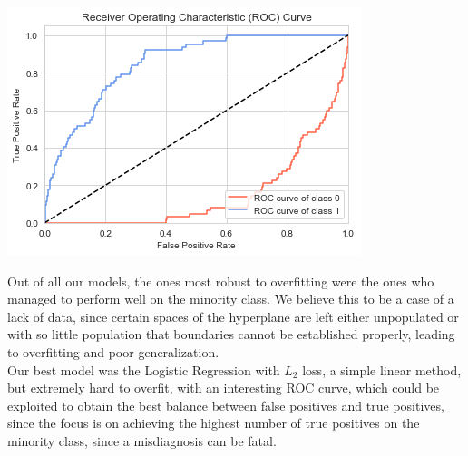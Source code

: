 \documentclass[landscape,a0paper,fontscale=0.285]{baposter} %
\begin{document}
\begin{poster}
{\begin{multicols}{2}
  \begin{center}
  \includegraphics[width=0.9\linewidth]{rocfinak.png}
  \label{fig:roc}
  \end{center}

  Out of all our models, the ones most robust to overfitting were the ones who managed to perform well on the minority class. We believe this to be a case of a lack of data, since certain spaces of the hyperplane are left either unpopulated or with so little population that boundaries cannot be established properly, leading to overfitting and poor generalization.\\

  Our best model was the Logistic Regression with $L_{2}$ loss, a simple linear method, but extremely hard to overfit, with an interesting ROC curve, which could be exploited to obtain the best balance between false positives and true positives, since the focus is on achieving the highest number of true positives on the minority class, since a misdiagnosis can be fatal.\\


\end{multicols}
}



\end{poster}
\end{document}
